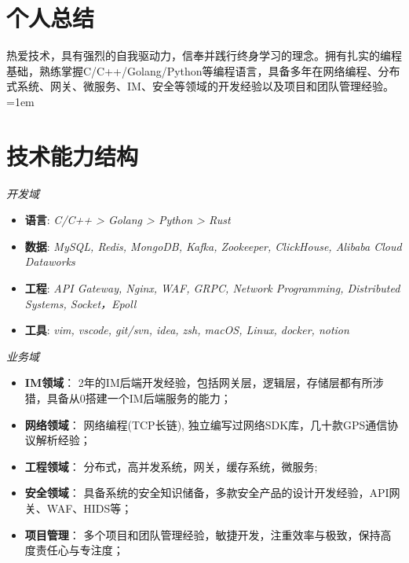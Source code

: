 



\section{个人总结}

\sloppy
热爱技术，具有强烈的自我驱动力，信奉并践行终身学习的理念。拥有扎实的编程基础，熟练掌握C/C++/Golang/Python等编程语言，具备多年在网络编程、分布式系统、网关、微服务、IM、安全等领域的开发经验以及项目和团队管理经验。
\emergencystretch=1em

\vspace{0.2cm}

\section{技术能力结构}

\textit{开发域}
\begin{itemize}[parsep=0.2ex]
  \item \textbf{语言}: \textit{C/C++ > Golang > Python > Rust}
  \item \textbf{数据}: \textit{MySQL, Redis, MongoDB, Kafka, Zookeeper, ClickHouse, Alibaba Cloud Dataworks}
  \item \textbf{工程}: \textit{API Gateway, Nginx, WAF, GRPC, Network Programming, Distributed Systems, Socket，Epoll}
  \item \textbf{工具}: \textit{vim, vscode, git/svn, idea, zsh, macOS, Linux, docker, notion}
\end{itemize}

\textit{业务域}
\begin{itemize}[parsep=0.2ex]
  \item \textbf{IM领域}：   2年的IM后端开发经验，包括网关层，逻辑层，存储层都有所涉猎，具备从0搭建一个IM后端服务的能力；
  \item \textbf{网络领域}： 网络编程(TCP长链), 独立编写过网络SDK库，几十款GPS通信协议解析经验；
  \item \textbf{工程领域}： 分布式，高并发系统，网关，缓存系统，微服务;
  \item \textbf{安全领域}： 具备系统的安全知识储备，多款安全产品的设计开发经验，API网关、WAF、HIDS等；
  \item \textbf{项目管理}： 多个项目和团队管理经验，敏捷开发，注重效率与极致，保持高度责任心与专注度；
\end{itemize}

